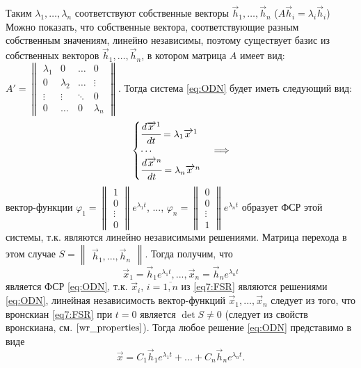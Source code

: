 Таким $\lambda_1, \dots, \lambda_n$ соответствуют собственные векторы $\overrightarrow{h}_1, \dots, \overrightarrow{h}_n$ ($A \overrightarrow{h}_i = \lambda_i \overrightarrow{h}_i$)
Можно показать, что собственные вектора, соответствующие разным собственным значениям, линейно независимы, 
поэтому существует базис из собственных векторов $\overrightarrow{h}_1, \dots, \overrightarrow{h}_n$, в котором матрица $A$ имеет вид: 
$A' = \begin{Vmatrix} 
	\lambda_1 & 0 & \ldots & 0 \\ 
	0 & \lambda_2 & \ldots & \vdots \\  
	\vdots& \vdots & \ddots &  0 \\ 
	0 & \ldots & 0 & \lambda_n 
\end{Vmatrix}$.
Тогда система \eqref{eq:ODN} будет иметь следующий вид: 
\[ \begin{cases}
    \cfrac{d \overrightarrow{x\,}^1}{dt} = \lambda_1 \overrightarrow{x \,}^1 \\
    \cdots \\
    \cfrac{d \overrightarrow{x \,}^n}{dt} = \lambda_n \overrightarrow{x \,}^n
\end{cases} \Longrightarrow \]
вектор-функции $\varphi_1 = \begin{Vmatrix*} 1 \\ 0 \\ \vdots \\ 0 \end{Vmatrix*} e^{\lambda_1 t}$, ..., 
$\varphi_n = \begin{Vmatrix*} 0 \\ 0 \\ \vdots \\ 1 \end{Vmatrix*} e^{\lambda_n t}$ 
образует ФСР этой системы, т.к. являются линейно независимыми решениями.
Матрица перехода в этом случае $S = \begin{Vmatrix*} \overrightarrow{h}_1,  ...,  \overrightarrow{h}_n \end{Vmatrix*}$. 
Тогда получим, что
\begin{equation}
  \overrightarrow{x}_1 = \overrightarrow{h}_1 e^{\lambda_1 t}, ..., \overrightarrow{x}_n = \overrightarrow{h}_n e^{\lambda_n t} \label{eq7:FSR}
\end{equation} является ФСР \eqref{eq:ODN}, т.к. $\overrightarrow{x}_i, \,i= \overline{1, n}$ из \eqref{eq7:FSR} являются решениями \eqref{eq:ODN}, 
линейная независимость вектор-функций $\overrightarrow{x}_1, ..., \overrightarrow{x}_n$ следует из того, что вронскиан \eqref{eq7:FSR} при $t=0$ является $\det S \neq 0$ (следует из свойств вронскиана, см. $\eqref{wr_properties}$).
Тогда любое решение \eqref{eq:ODN} представимо в виде
\begin{equation}
  \overrightarrow{x} = C_1 \overrightarrow{h}_1 e^{\lambda_1 t} + ... + C_n \overrightarrow{h}_n e^{\lambda_n t}.
\end{equation}

